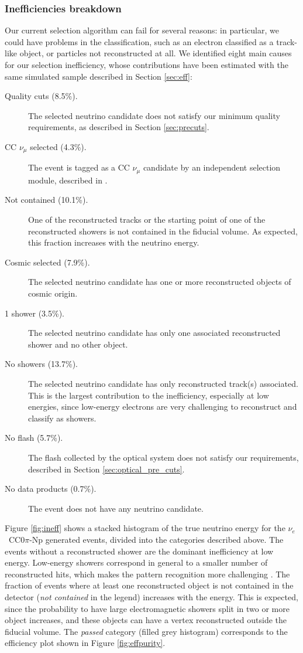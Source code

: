 \subsubsection{Inefficiencies breakdown}\label{sec:ineff}
Our current selection algorithm can fail for several reasons: in particular, we could have problems in the classification, such as an electron classified as a track-like object, or particles not reconstructed at all. We identified eight main causes for our selection inefficiency, whose contributions have been estimated with the same simulated sample described in Section \ref{sec:eff}:
\begin{description}

\item[Quality cuts (8.5\%).] {The selected neutrino candidate does not satisfy our minimum quality requirements, as described in Section \ref{sec:precuts}.}
\item[CC $\nu_{\mu}$ selected (4.3\%).]  {The event is tagged as a CC $\nu_{\mu}$ candidate by an independent selection module, described in \cite{ubxsec}}. 
\item[Not contained (10.1\%).] {One of the reconstructed tracks or the starting point of one of the reconstructed showers is not contained in the fiducial volume. As expected, this fraction increases with the neutrino energy}.
\item[Cosmic selected (7.9\%).] {The selected neutrino candidate has one or more reconstructed objects of cosmic origin}.
\item[1 shower (3.5\%).] {The selected neutrino candidate has only one associated reconstructed shower and no other object}. 
\item[No showers (13.7\%).]  {The selected neutrino candidate has only reconstructed track(s) associated. This is the largest contribution to the inefficiency, especially at low energies, since low-energy electrons are very challenging to reconstruct and classify as showers.}
\item[No flash (5.7\%).]  {The flash collected by the optical system does not satisfy our requirements, described in Section \ref{sec:optical_pre_cuts}}.
\item[No data products (0.7\%).] {The event does not have any neutrino candidate}.
\end{description}

Figure \ref{fig:ineff} shows a stacked histogram of the true neutrino energy for the $\nu_e$~CC0$\pi$-Np generated events, divided into the categories described above. The events without a reconstructed shower are the dominant inefficiency at low energy. Low-energy showers correspond in general to a smaller number of reconstructed hits, which makes the pattern recognition more challenging \cite{Acciarri:2017hat}. The fraction of events where at least one reconstructed object is not contained in the detector (\emph{not contained} in the legend) increases with the energy. This is expected, since the probability to have large electromagnetic showers split in two or more object increases, and these objects can have a vertex reconstructed outside the fiducial volume. The \emph{passed} category (filled grey histogram) corresponds to the efficiency plot shown in Figure \ref{fig:effpurity}.

